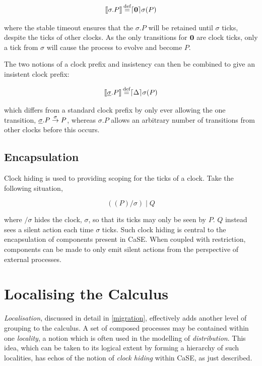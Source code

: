\begin{equation}
[\hspace{-0.3ex}[ \sigma.P ]\hspace{-0.3ex}] \operatorname{\stackrel{\textrm{def}}{=}} \lceil{\textbf{0}}\rceil {\sigma} ({P})
\end{equation}

\noindent where the stable timeout ensures that the $\sigma.P$ will be
retained until $\sigma$ ticks, despite the ticks of other clocks.  As
the only transitions for $\textbf{0}$ are clock ticks, only a tick from
$\sigma$ will cause the process to evolve and become $P$.

The two notions of a clock prefix and insistency can then be combined
to give an insistent clock prefix:

\begin{equation}
[\hspace{-0.3ex}[ \underline{\sigma}.P ]\hspace{-0.3ex}] \operatorname{\stackrel{\textrm{def}}{=}} \lceil{\Delta}\rceil {\sigma} ({P})
\end{equation}

\noindent which differs from a standard clock prefix by only ever
allowing the one transition, $\underline{\sigma}.P \stackrel{\sigma}{\rightarrow}
P$, whereas $\sigma.P$ allows an arbitrary number of transitions from
other clocks before this occurs.

\subsection{Encapsulation}

Clock hiding is used to providing scoping for the ticks of a
clock.  Take the following situation,

\begin{equation}
\label{clockhidingex}
  ((P) / \sigma)\;|\;Q
\end{equation}

\noindent where $/ \sigma$ hides the clock, $\sigma$, so that its
ticks may only be seen by $P$.  $Q$ instead sees a silent action each
time $\sigma$ ticks.  Such clock hiding is central to the
encapsulation of components present in CaSE.  When coupled with
restriction, components can be made to only emit silent actions from
the perspective of external processes.

\section{Localising the Calculus}

\emph{Localisation}, discussed in detail in \ref{migration}, effectively
adds another level of grouping to the calculus.  A set of composed
processes may be contained within one \emph{locality}, a notion which is
often used in the modelling of \emph{distribution}.  This idea, which
can be taken to its logical extent by forming a hierarchy of such
localities, has echos of the notion of \emph{clock hiding} within CaSE,
as just described.

